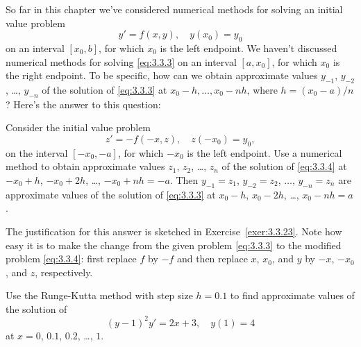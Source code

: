 
\enlargethispage{.5in}
\noindent
So far in this chapter we've considered numerical methods for solving an initial value problem
\begin{equation}
  \label{eq:3.3.3}y'=f(x,y),\quad y(x_{0})=y_{0}
\end{equation}
on an interval $[x_{0},b]$, for which $x_{0}$ is the left endpoint. We haven't discussed numerical
methods for solving \eqref{eq:3.3.3} on an interval $[a,x_{0}]$, for which $x_{0}$ is the right
endpoint. To be specific, how can we obtain approximate values $y_{-1}$, $y_{-2}$, \dots, $y_{-n}$
of the solution of \eqref{eq:3.3.3} at $x_{0}-h,\dots,x_{0}-nh$, where $h=(x_{0}-a)/n$? Here's the
answer to this question:

\medskip
\color{blue}
Consider the initial value problem
\begin{equation}
  \label{eq:3.3.4}z'=-f(-x,z),\quad z(-x_{0})=y_{0},
\end{equation}
on the interval $[-x_{0},-a]$, for which $-x_{0}$ is the left endpoint. Use a numerical method to
obtain approximate values $z_{1}$, $z_{2}$, \dots, $z_{n}$ of the solution of \eqref{eq:3.3.4} at
$-x_{0}+h$, $-x_{0}+2h$, \dots, $-x_{0}+nh=-a$. Then $y_{-1}=z_{1}$, $y_{-2}=z_{2}$, $\dots$,
$y_{-n}=z_{n}$ are approximate values of the solution of \eqref{eq:3.3.3} at $x_{0}-h$,
$x_{0}-2h$, \dots, $x_{0}-nh=a$.
\color{black}
\medskip

The justification for this answer is sketched in Exercise~\ref{exer:3.3.23}. Note how easy it is to
make the change from the given problem \eqref{eq:3.3.3} to the modified problem \eqref{eq:3.3.4}: first
replace $f$ by $-f$ and then replace $x$, $x_{0}$, and $y$ by $-x$, $-x_{0}$, and $z$, respectively.

\begin{example}
  \label{example:3.3.5} \rm Use the Runge-Kutta method with step size $h=0.1$ to find approximate
  values of the solution of
  \begin{equation}
    \label{eq:3.3.5}(y-1)^{2}y'=2x+3,\quad y(1)=4
  \end{equation}
  at $x=0$, $0.1$, $0.2$, \dots, $1$.
\end{example}

